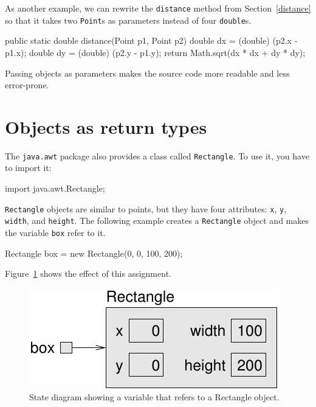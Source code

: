 \documentclass[12pt]{book}
\theoremstyle{exercise}
\newcommand{\java}[1]{\verb"#1"}
\begin{document}
As another example, we can rewrite the \java{distance} method from Section~\ref{distance} so that it takes two \java{Point}s as parameters instead of four \java{double}s.

\begin{code}
    public static double distance(Point p1, Point p2) {
        double dx = (double) (p2.x - p1.x);
        double dy = (double) (p2.y - p1.y);
        return Math.sqrt(dx * dx + dy * dy);
    }
\end{code}

Passing objects as parameters makes the source code more readable and less error-prone.


\section{Objects as return types}


The \java{java.awt} package also provides a class called \java{Rectangle}.
To use it, you have to import it:

\begin{code}
import java.awt.Rectangle;
\end{code}

\java{Rectangle} objects are similar to points, but they have four attributes: \java{x}, \java{y}, \java{width}, and \java{height}.
The following example creates a \java{Rectangle} object and makes the variable \java{box} refer to it.

\begin{code}
    Rectangle box = new Rectangle(0, 0, 100, 200);
\end{code}

Figure~\ref{fig.rectangle} shows the effect of this assignment.

\begin{figure}
\begin{center}
\includegraphics{figs/rectangle.pdf}
\caption{State diagram showing a variable that refers to a Rectangle object.}
\label{fig.rectangle}
\end{center}
\end{figure}
\end{document}
